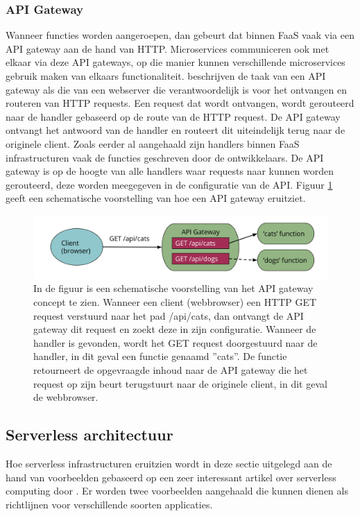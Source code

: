\subsubsection{API Gateway}
Wanneer functies worden aangeroepen, dan gebeurt dat binnen FaaS vaak via een API gateway aan de hand van HTTP. Microservices communiceren ook met elkaar via deze API gateways, op die manier kunnen verschillende microservices gebruik maken van elkaars functionaliteit.
\textcite{Roberts2017} beschrijven de taak van een API gateway als die van een webserver die verantwoordelijk is voor het ontvangen en routeren van HTTP requests. Een request dat wordt ontvangen, wordt gerouteerd naar de handler gebaseerd op de route van de HTTP request. De API gateway ontvangt het antwoord van de handler en routeert dit uiteindelijk terug naar de originele client. Zoals eerder al aangehaald zijn handlers binnen FaaS infrastructuren vaak de functies geschreven door de ontwikkelaars. De API gateway is op de hoogte van alle handlers waar requests naar kunnen worden gerouteerd, deze worden meegegeven in de configuratie van de API. Figuur \ref{fig:api-gateway} geeft een schematische voorstelling van hoe een API gateway eruitziet.
 
 \begin{figure}
    \includegraphics[width=1\textwidth]{img/api_gateway.png}
    \caption{In de figuur is een schematische voorstelling van het API gateway concept te zien. Wanneer een client (webbrowser) een HTTP GET request verstuurd naar het pad /api/cats, dan ontvangt de API gateway dit request en zoekt deze in zijn configuratie. Wanneer de handler is gevonden, wordt het GET request doorgestuurd naar de handler, in dit geval een functie genaamd ''cats''. De functie retourneert de opgevraagde inhoud naar de API gateway die het request op zijn beurt terugstuurt naar de originele client, in dit geval de webbrowser.\autocite{Roberts2018}} 
    \label{fig:api-gateway}  
\end{figure}

\subsection{Serverless architectuur}
Hoe serverless infrastructuren eruitzien wordt in deze sectie uitgelegd aan de hand van voorbeelden gebaseerd op een zeer interessant artikel over serverless computing door \textcite{Roberts2018}. Er worden twee voorbeelden aangehaald die kunnen dienen als richtlijnen voor verschillende soorten applicaties.

